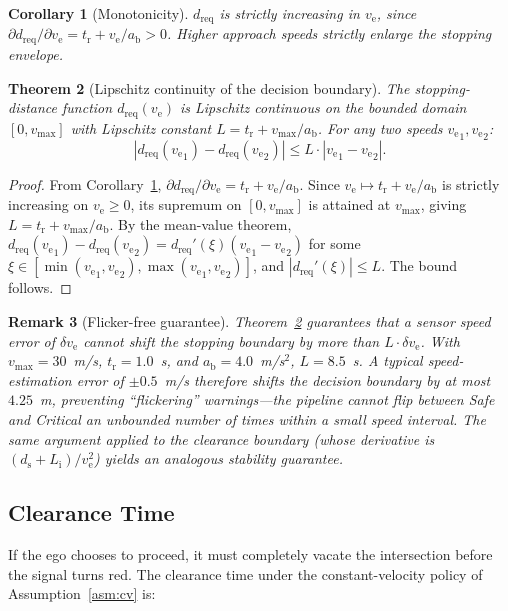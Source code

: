 \documentclass[conference, a4paper]{IEEEtran}
\theoremstyle{plain}
\newtheorem{theorem}{Theorem}
\newtheorem{corollary}[theorem]{Corollary}
\newtheorem{remark}[theorem]{Remark}
\newcommand{\dreq}{d_{\mathrm{req}}}
\newcommand{\ds}{d_{\mathrm{s}}}
\newcommand{\ab}{a_{\mathrm{b}}}
\newcommand{\tr}{t_{\mathrm{r}}}
\newcommand{\Li}{L_{\mathrm{i}}}
\newcommand{\ve}{v_{\mathrm{e}}}
\begin{document}
\begin{corollary}[Monotonicity]
\label{cor:mono}
$\dreq$ is strictly increasing in $\ve$, since
$\partial \dreq/\partial \ve = \tr + \ve/\ab > 0$. Higher approach speeds
strictly enlarge the stopping envelope.
\end{corollary}

\begin{theorem}[Lipschitz continuity of the decision boundary]
\label{thm:lipschitz}
The stopping-distance function $\dreq(\ve)$ is Lipschitz continuous on the
bounded domain $[0, v_{\max}]$ with Lipschitz constant
$L = \tr + v_{\max} / \ab$. For any two speeds ${\ve}_1, {\ve}_2$:
\[
|\dreq({\ve}_1) - \dreq({\ve}_2)| \leq L \cdot |{\ve}_1 - {\ve}_2|.
\]
\end{theorem}

\begin{proof}
From Corollary~\ref{cor:mono}, $\partial \dreq / \partial \ve = \tr + \ve / \ab$.
Since $\ve \mapsto \tr + \ve / \ab$ is strictly increasing on $\ve \geq 0$,
its supremum on $[0, v_{\max}]$ is attained at $v_{\max}$, giving
$L = \tr + v_{\max} / \ab$. By the mean-value theorem,
$\dreq({\ve}_1) - \dreq({\ve}_2) = \dreq'(\xi)({\ve}_1 - {\ve}_2)$ for some
$\xi \in [\min({\ve}_1,{\ve}_2), \max({\ve}_1,{\ve}_2)]$, and
$|\dreq'(\xi)| \leq L$. The bound follows.
\end{proof}

\begin{remark}[Flicker-free guarantee]
\label{rem:flicker}
Theorem~\ref{thm:lipschitz} guarantees that a sensor speed error of
$\delta \ve$ cannot shift the stopping boundary by more than $L \cdot \delta \ve$.
With $v_{\max} = 30$~m/s, $\tr = 1.0$~s, and $\ab = 4.0$~m/s$^2$,
$L = 8.5$~s. A typical speed-estimation error of $\pm 0.5$~m/s therefore
shifts the decision boundary by at most $4.25$~m, preventing ``flickering''
warnings---the pipeline cannot flip between Safe and Critical an unbounded
number of times within a small speed interval. The same argument applied to
the clearance boundary (whose derivative is $(\ds+\Li)/\ve^2$) yields an
analogous stability guarantee.
\end{remark}

\subsection{Clearance Time}
\label{subsec:clearance}

If the ego chooses to proceed, it must completely vacate the intersection
before the signal turns red. The clearance time under the constant-velocity
policy of Assumption~\ref{asm:cv} is:
\end{document}
